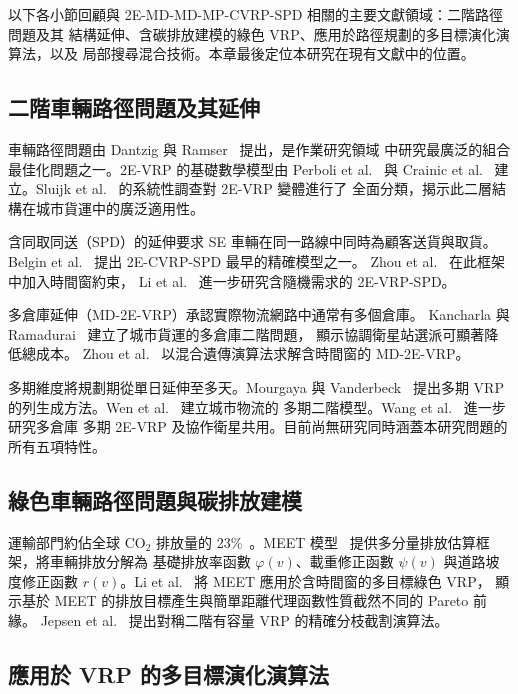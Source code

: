 \documentclass[11pt, a4paper]{article}
\numberwithin{equation}{section}
\begin{document}
以下各小節回顧與 2E-MD-MD-MP-CVRP-SPD 相關的主要文獻領域：二階路徑問題及其
結構延伸、含碳排放建模的綠色 VRP、應用於路徑規劃的多目標演化演算法，以及
局部搜尋混合技術。本章最後定位本研究在現有文獻中的位置。

\subsection{二階車輛路徑問題及其延伸}

車輛路徑問題由 Dantzig 與 Ramser~\cite{dantzig1959} 提出，是作業研究領域
中研究最廣泛的組合最佳化問題之一。2E-VRP 的基礎數學模型由
Perboli et al.~\cite{perboli2011} 與 Crainic et al.~\cite{crainic2011}
建立。Sluijk et al.~\cite{sluijk2023} 的系統性調查對 2E-VRP 變體進行了
全面分類，揭示此二層結構在城市貨運中的廣泛適用性。

含同取同送（SPD）的延伸要求 SE 車輛在同一路線中同時為顧客送貨與取貨。
Belgin et al.~\cite{belgin2018} 提出 2E-CVRP-SPD 最早的精確模型之一。
Zhou et al.~\cite{zhou2022spd} 在此框架中加入時間窗約束，
Li et al.~\cite{li2022stoch} 進一步研究含隨機需求的 2E-VRP-SPD。

多倉庫延伸（MD-2E-VRP）承認實際物流網路中通常有多個倉庫。
Kancharla 與 Ramadurai~\cite{kancharla2019} 建立了城市貨運的多倉庫二階問題，
顯示協調衛星站選派可顯著降低總成本。
Zhou et al.~\cite{zhou2018md} 以混合遺傳演算法求解含時間窗的 MD-2E-VRP。

多期維度將規劃期從單日延伸至多天。Mourgaya 與 Vanderbeck~\cite{mourgaya2007}
提出多期 VRP 的列生成方法。Wen et al.~\cite{wen2010} 建立城市物流的
多期二階模型。Wang et al.~\cite{wang2021,wang2023} 進一步研究多倉庫
多期 2E-VRP 及協作衛星共用。目前尚無研究同時涵蓋本研究問題的所有五項特性。

\subsection{綠色車輛路徑問題與碳排放建模}

運輸部門約佔全球 CO$_2$ 排放量的 23\%~\cite{iea2022}。MEET
模型~\cite{hickman1999} 提供多分量排放估算框架，將車輛排放分解為
基礎排放率函數 $\varphi(v)$、載重修正函數 $\psi(v)$ 與道路坡度修正函數
$r(v)$。Li et al.~\cite{li2025} 將 MEET 應用於含時間窗的多目標綠色 VRP，
顯示基於 MEET 的排放目標產生與簡單距離代理函數性質截然不同的 Pareto 前緣。
Jepsen et al.~\cite{jepsen2013} 提出對稱二階有容量 VRP 的精確分枝截割演算法。

\subsection{應用於 VRP 的多目標演化演算法}
\end{document}
